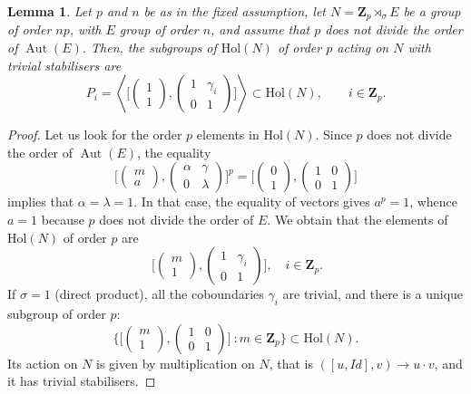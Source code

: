 \documentclass[12pt]{article}
\newtheorem{lemma}[theorem]{Lemma}
\theoremstyle{definition}
\newcommand{\Z}{\mathbf Z}
\newcommand{\Hol}{\mathrm{Hol}}
\newcommand{\Aut}{\operatorname{Aut}}
\begin{document}
 \begin{lemma}\label{ordpsubgp}
   Let $p$ and $n$ be as in the fixed assumption, let $N=\Z_p\rtimes_{\sigma}E$ be a group of order $np$, with $E$ group of order $n$, and assume that $p$ does not divide the order of $\Aut(E)$.
   Then, the subgroups of $\mathrm{Hol}(N)$ of order $p$ acting on $N$ with trivial stabilisers are 
   $$
		P_i=\left\langle \Big[\begin{pmatrix}
		1\\
		1
		\end{pmatrix},\begin{pmatrix}
		1 & \gamma_i\\
		0&1
		\end{pmatrix}\Big] \right\rangle\subset \Hol(N),\qquad i\in\Z_p.
		$$
 \end{lemma}
\begin{proof}
 Let us look for the order $p$ elements in $\Hol(N)$. Since $p$ does not divide the order of $\Aut(E)$, the equality
		$$
		\Big[\begin{pmatrix}
		m\\
		a
		\end{pmatrix},
		\begin{pmatrix}
		\alpha & \gamma\\
		0&\lambda
		\end{pmatrix}\Big]^p=
		\Big[\begin{pmatrix}0\\
		1
		\end{pmatrix},
		\begin{pmatrix}
		1 & 0\\
		0& 1
		\end{pmatrix}\Big]$$ implies that $\alpha=\lambda=1$. In that case, the equality of vectors gives $a^p=1$, whence $a=1$ because $p$ does not divide the order of $E$. We obtain that the elements of $\Hol(N)$ of order $p$ are
		$$
		\ \Big[\begin{pmatrix}
		m\\
		1
		\end{pmatrix},\begin{pmatrix}
		1 & \gamma_{i}\\
		0&1
		\end{pmatrix}\Big],\quad  i\in\Z_p.
		$$
		If $\sigma=1$ (direct product), all the coboundaries $\gamma_i$ are trivial, 
		and there is a unique subgroup of order $p$:
		$$
		\Big\{\Big[\begin{pmatrix}
		m\\
		1
		\end{pmatrix},\begin{pmatrix}
		1 & 0\\
		0&1
		\end{pmatrix}\Big]\ \colon m\in\Z_p
		\Big\}\subset \Hol(N).$$
Its action on $N$ is given by multiplication on $N$, 
that is $ ([u, Id],v)\to u\cdot v $,
 and it has trivial stabilisers.
 

\end{proof}
\end{document}

